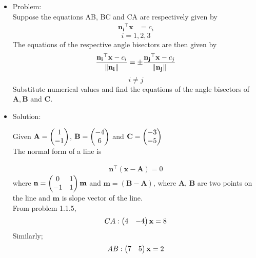 \documentclass{article}
\begin{document}
\let\vec\mathbf
\begin{itemize}

\item Problem:
   \\ Suppose the equations AB, BC and CA are respectively given by 
                 \begin{align}
                 \label{eq:a}
                 \vec{n_i}^{\top}\vec{x} &= c_i
                 \end{align}      
                \[i=1,2,3\]
The equations of the respective angle bisectors are then given by
\begin{align}
\label{eq:b}
\frac{\vec{n_i}^{\top}\vec{x}-c_i}{\norm{\vec{n_i}}} = \pm\frac{\vec{n_j}^{\top}\vec{x}-c_j}{\norm{{\vec{n_j}}}}
\end{align}
\[i \neq j\]
Substitute numerical values and find the equations of the angle bisectors of $\vec{A},\vec{B}$ and $\vec{C}$.



\item Solution:
    
Given $\vec{A} = \myvec{1\\-1}$, $\vec{B} = \myvec{-4\\6}$ and $\vec{C} = \myvec{-3\\-5}$
 \\The normal form of a line is 
                                    
           \begin{align}
           \label{eq:c}
           \vec{n}^{\top}(\vec{x}-\vec{A}) = 0   
           \end{align}
           where $\vec{n} = \myvec{0&1\\-1&1}\vec{m}$ and $\vec{m} = (\vec{B} - \vec{A})$, where $\vec{A}$, $\vec{B}$ are two points on the line and $\vec{m}$ is slope vector of the line.\\
 From problem 1.1.5,
  \begin{align}
  \label{eq:d}
        CA : \myvec{4&-4}\vec{x} = 8
        \end{align}
  Similarly;
        \begin{align}
         \label{eq:e}
        AB : \myvec{7&5}\vec{x} = 2
        \end{align}
        

\end{itemize}
\end{document}
